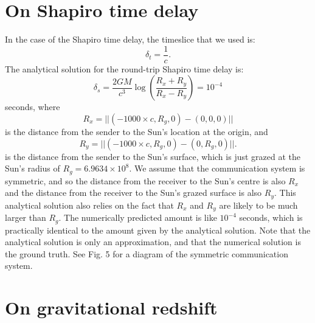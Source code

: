 \documentclass[12pt]{article}
\begin{document}
\section{On Shapiro time delay}


In the case of the Shapiro time delay, the timeslice that we used is:
\begin{equation}
\label{dt_1_div_c}
\delta_{t} = \frac{1}{c}.
\end{equation}
The analytical solution for the round-trip Shapiro time delay is:
\begin{equation}
\label{delta_s}
\delta_{s} = \frac{2GM}{c^3} \log\left( \frac{R_x + R_y}{R_x - R_y} \right) = 10^{-4}
\end{equation}
seconds, where 
\begin{equation}
\label{r_x}
R_x = \lvert\lvert (-1000 \times c, R_g, 0) - (0, 0, 0) \rvert\rvert
\end{equation}
is the distance from the sender to the Sun's location at the origin, and
\begin{equation}
\label{r_y}
R_y = \lvert\lvert (-1000 \times c, R_g, 0) - (0, R_g, 0) \rvert\rvert.
\end{equation}
is the distance from the sender to the Sun's surface, which is just grazed at the Sun's radius of $R_g = 6.9634 \times 10^8$.
We assume that the communication system is symmetric, and so the distance from the receiver to the Sun's centre is also $R_x$ and the distance from the receiver to the Sun's grazed surface is also $R_y$.
This analytical solution also relies on the fact that $R_x$ and $R_y$ are likely to be much larger than $R_g$.
The numerically predicted amount is like $10^{-4}$ seconds, which is practically identical to the amount given by the analytical solution.
Note that the analytical solution is only an approximation, and that the numerical solution is the ground truth.
See Fig. 5 for a diagram of the symmetric communication system.







\section{On gravitational redshift}
\end{document}
